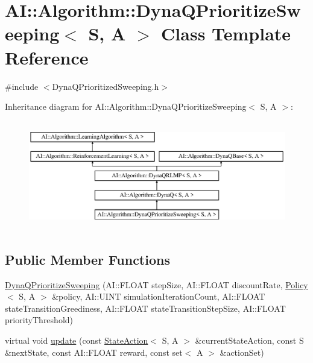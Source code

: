 \hypertarget{classAI_1_1Algorithm_1_1DynaQPrioritizeSweeping}{\section{A\-I\-:\-:Algorithm\-:\-:Dyna\-Q\-Prioritize\-Sweeping$<$ S, A $>$ Class Template Reference}
\label{classAI_1_1Algorithm_1_1DynaQPrioritizeSweeping}
}


{\ttfamily \#include $<$Dyna\-Q\-Prioritized\-Sweeping.\-h$>$}

Inheritance diagram for A\-I\-:\-:Algorithm\-:\-:Dyna\-Q\-Prioritize\-Sweeping$<$ S, A $>$\-:\begin{figure}[H]
\begin{center}
\leavevmode
\includegraphics[height=4.794520cm]{classAI_1_1Algorithm_1_1DynaQPrioritizeSweeping}
\end{center}
\end{figure}
\subsection*{Public Member Functions}
\begin{DoxyCompactItemize}
\item 
\hyperlink{classAI_1_1Algorithm_1_1DynaQPrioritizeSweeping_a7be2ca032071678ed6e653821cd54026}{Dyna\-Q\-Prioritize\-Sweeping} (A\-I\-::\-F\-L\-O\-A\-T step\-Size, A\-I\-::\-F\-L\-O\-A\-T discount\-Rate, \hyperlink{classAI_1_1Algorithm_1_1Policy}{Policy}$<$ S, A $>$ \&policy, A\-I\-::\-U\-I\-N\-T simulation\-Iteration\-Count, A\-I\-::\-F\-L\-O\-A\-T state\-Transition\-Greediness, A\-I\-::\-F\-L\-O\-A\-T state\-Transition\-Step\-Size, A\-I\-::\-F\-L\-O\-A\-T priority\-Threshold)
\item 
virtual void \hyperlink{classAI_1_1Algorithm_1_1DynaQPrioritizeSweeping_ad08b55f3cf927189dd31abf9fc1c2959}{update} (const \hyperlink{classAI_1_1StateAction}{State\-Action}$<$ S, A $>$ \&current\-State\-Action, const S \&next\-State, const A\-I\-::\-F\-L\-O\-A\-T reward, const set$<$ A $>$ \&action\-Set)
\end{DoxyCompactItemize}
